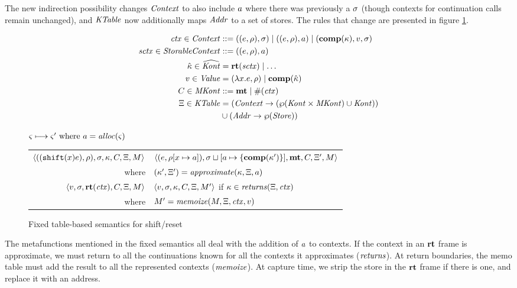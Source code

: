 \documentclass{llncs}
\begin{document}
The new indirection possibility changes $\mathit{Context}$ to also include
$a$ where there was previously a $\sigma$ (though contexts for
continuation calls remain unchanged), and $\mathit{KTable}$ now additionally
maps $\mathit{Addr}$ to a set of stores. The rules that change are presented in figure \ref{fig:shift-reset-table1}.

\begin{align*}
  \mathit{ctx} \in \mathit{Context} &::= ((e,\rho),\sigma) \mid ((e,\rho),a) \mid (\mathbf{comp}(\kappa),v,\sigma) \\
  \mathit{sctx} \in \mathit{StorableContext} &::= ((e,\rho),a) \\
  \hat{\kappa} \in \widehat{\mathit{Kont}} &= \mathbf{rt}(\mathit{sctx}) \mid \ldots \\
  v \in \mathit{Value} &= (\lambda{} x. e, \rho) \mid \mathbf{comp}(\hat{\kappa}) \\
  C \in \mathit{MKont} &::= \mathbf{mt} \mid \#(\mathit{ctx}) \\
  \Xi \in \mathit{KTable} &= (\mathit{Context} \to (\wp(\mathit{Kont} \times \mathit{MKont}) \cup \mathit{Kont})) \\
                   &\cup (\mathit{Addr} \to \wp(\mathit{Store}))
\end{align*}

\begin{figure}
  \centering
  $\varsigma \longmapsto \varsigma' \text{ where } a = \mathit{alloc}(\varsigma)$ \\
  \begin{tabular}{r|l}
    \hline
    $\langle ((\texttt{shift} (x) e), \rho), \sigma, \kappa, C, \Xi, M \rangle$
    &
    $\langle (e, \rho[x \mapsto a]), \sigma\sqcup[a \mapsto \{ \mathbf{comp}(\kappa') \}],\mathbf{mt},C,\Xi',M \rangle$
    \\
    where & $(\kappa',\Xi') = \mathit{approximate}(\kappa, \Xi, a)$
\\
   $\langle v, \sigma, \mathbf{rt}(\mathit{ctx}), C, \Xi, M \rangle$
   &
   $\langle v, \sigma, \kappa, C, \Xi, M' \rangle$
   if $\kappa \in \mathit{returns}(\Xi, \mathit{ctx})$
   \\
   where & $M' = \mathit{memoize}(M, \Xi, \mathit{ctx}, v)$
  \end{tabular}
  \caption{Fixed table-based semantics for shift/reset}
  \label{fig:shift-reset-table1}
\end{figure}

The metafunctions mentioned in the fixed semantics all deal with the
addition of $a$ to contexts. If the context in an $\mathbf{rt}$ frame is
approximate, we must return to all the continuations known for all the
contexts it approximates ($\mathit{returns}$). At return boundaries, the memo
table must add the result to all the represented contexts
($\mathit{memoize}$). At capture time, we strip the store in the $\mathbf{rt}$ frame
if there is one, and replace it with an address.
\end{document}
